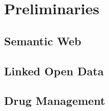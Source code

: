 \chapter{Preliminaries}
\label{cha:prelims}

\section{Semantic Web}
\label{sec:semantic-web}

\section{Linked Open Data}
\label{sec:linked-open-data}

\section{Drug Management}
\label{sec:drug-management}

